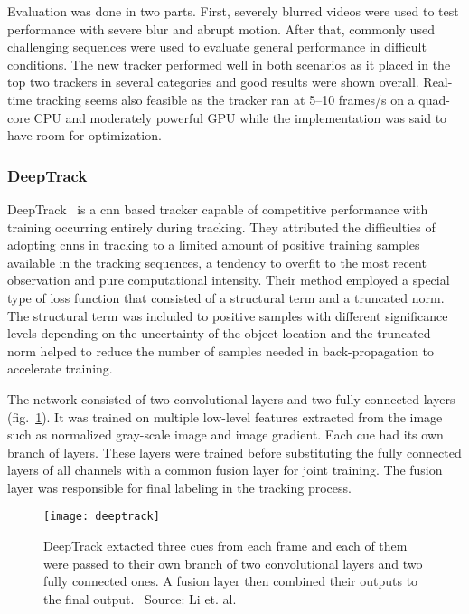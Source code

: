 Evaluation was done in two parts. First, severely blurred videos were used to test
performance with severe blur and abrupt motion. After that, commonly used challenging
sequences were used to evaluate general performance in difficult conditions. The new
tracker performed well in both scenarios as it placed in the top two trackers in several
categories and good results were shown overall. Real-time tracking seems also feasible
as the tracker ran at 5--10 frames/s on a quad-core CPU and moderately powerful GPU while
the implementation was said to have room for optimization.~\cite{BLUR_TRACK}

\subsubsection{DeepTrack}
DeepTrack~\cite{DEEPTRACK} is a \ac{cnn} based tracker capable of competitive performance
with training occurring entirely during tracking. They attributed the difficulties of
adopting \ac{cnn}s in tracking to a limited amount of positive training samples available
in the tracking sequences, a tendency to overfit to the most recent observation and pure
computational intensity. Their method employed a special type of loss function that
consisted of a structural term and a truncated norm. The structural term was included
to positive samples with different significance levels depending on the uncertainty of
the object location and the truncated norm helped to reduce the number of samples needed
in back-propagation to accelerate training.~\cite{DEEPTRACK}

The network consisted of two convolutional layers and two fully connected layers (fig.~\ref{fig:deeptrack}).
It was trained on multiple low-level features extracted from the image such as normalized
gray-scale image and image gradient. Each cue had its own branch of layers. These
layers were trained before substituting the fully connected layers of all channels
with a common fusion layer for joint training. The fusion layer was responsible for
final labeling in the tracking process.~\cite{DEEPTRACK}

\begin{figure}[H]
\centering
\texttt{[image: deeptrack]}
\caption{DeepTrack extacted three cues from each frame and each of them were passed
         to their own branch of two convolutional layers and two fully connected ones.
         A fusion layer then combined their outputs to the final output.~\cite{DEEPTRACK} Source: Li et.
         al.~\cite{DEEPTRACK}}\label{fig:deeptrack}
\end{figure}

